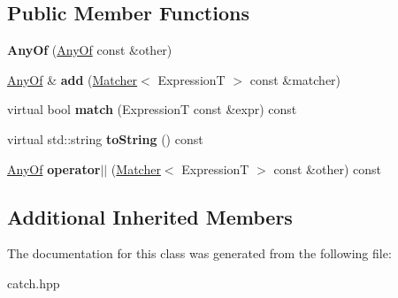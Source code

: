 \subsection*{Public Member Functions}
\begin{DoxyCompactItemize}
\item 
{\bfseries Any\+Of} (\hyperlink{classCatch_1_1Matchers_1_1Impl_1_1Generic_1_1AnyOf}{Any\+Of} const \&other)\hypertarget{classCatch_1_1Matchers_1_1Impl_1_1Generic_1_1AnyOf_a74fbc05b32d334fcbfd0fae0163a404e}{}\label{classCatch_1_1Matchers_1_1Impl_1_1Generic_1_1AnyOf_a74fbc05b32d334fcbfd0fae0163a404e}

\item 
\hyperlink{classCatch_1_1Matchers_1_1Impl_1_1Generic_1_1AnyOf}{Any\+Of} \& {\bfseries add} (\hyperlink{structCatch_1_1Matchers_1_1Impl_1_1Matcher}{Matcher}$<$ ExpressionT $>$ const \&matcher)\hypertarget{classCatch_1_1Matchers_1_1Impl_1_1Generic_1_1AnyOf_a3bce94b627551e5f96c5f9c6060413f0}{}\label{classCatch_1_1Matchers_1_1Impl_1_1Generic_1_1AnyOf_a3bce94b627551e5f96c5f9c6060413f0}

\item 
virtual bool {\bfseries match} (ExpressionT const \&expr) const \hypertarget{classCatch_1_1Matchers_1_1Impl_1_1Generic_1_1AnyOf_a2f97a08338e12deba541043a57d73db9}{}\label{classCatch_1_1Matchers_1_1Impl_1_1Generic_1_1AnyOf_a2f97a08338e12deba541043a57d73db9}

\item 
virtual std\+::string {\bfseries to\+String} () const \hypertarget{classCatch_1_1Matchers_1_1Impl_1_1Generic_1_1AnyOf_a7ecc6ec08b2018a643923a9d450aa328}{}\label{classCatch_1_1Matchers_1_1Impl_1_1Generic_1_1AnyOf_a7ecc6ec08b2018a643923a9d450aa328}

\item 
\hyperlink{classCatch_1_1Matchers_1_1Impl_1_1Generic_1_1AnyOf}{Any\+Of} {\bfseries operator$\vert$$\vert$} (\hyperlink{structCatch_1_1Matchers_1_1Impl_1_1Matcher}{Matcher}$<$ ExpressionT $>$ const \&other) const \hypertarget{classCatch_1_1Matchers_1_1Impl_1_1Generic_1_1AnyOf_a07f4ea2ae366a6521a5d7bff4522e8bf}{}\label{classCatch_1_1Matchers_1_1Impl_1_1Generic_1_1AnyOf_a07f4ea2ae366a6521a5d7bff4522e8bf}

\end{DoxyCompactItemize}
\subsection*{Additional Inherited Members}


The documentation for this class was generated from the following file\+:\begin{DoxyCompactItemize}
\item 
catch.\+hpp\end{DoxyCompactItemize}
